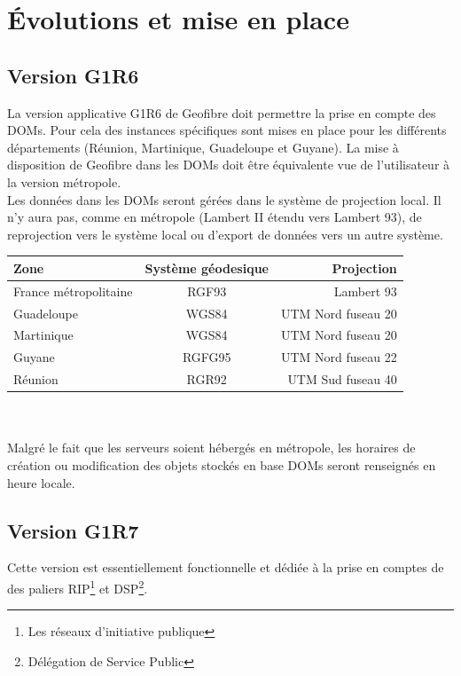 \chapter{\'Evolutions et mise en place}
\section{Version G1R6}

La version applicative G1R6 de Geofibre doit permettre la prise en compte des DOMs. Pour cela des instances spécifiques sont mises en place  pour les différents départements (Réunion, Martinique, Guadeloupe et Guyane).
La mise à disposition de Geofibre dans les DOMs doit être équivalente vue de l’utilisateur à la version métropole.
\\Les données dans les DOMs seront gérées dans le système de projection local. Il n’y aura pas, comme en métropole (Lambert II étendu vers Lambert 93), de reprojection vers le système local ou d’export de données vers un autre système.\\

\begin{tabular}{|l|c|r|}
  \hline
    Zone & Système géodesique & Projection \\
  \hline
  France métropolitaine & RGF93 & Lambert 93 \\
  Guadeloupe & WGS84 & UTM Nord fuseau 20 \\
  Martinique & WGS84 & UTM Nord fuseau 20 \\
  Guyane & RGFG95 & UTM Nord fuseau 22 \\
  Réunion & RGR92 & UTM Sud fuseau 40 \\
  \hline
\end{tabular}\\\\

Malgré le fait que les serveurs soient hébergés en métropole, les horaires de création ou modification des objets stockés en base DOMs seront renseignés en heure locale.

\section{Version G1R7}
Cette version est essentiellement  fonctionnelle et dédiée à la prise en comptes de des paliers RIP\footnote{Les réseaux d’initiative publique} et DSP\footnote{Délégation de Service Public}.

